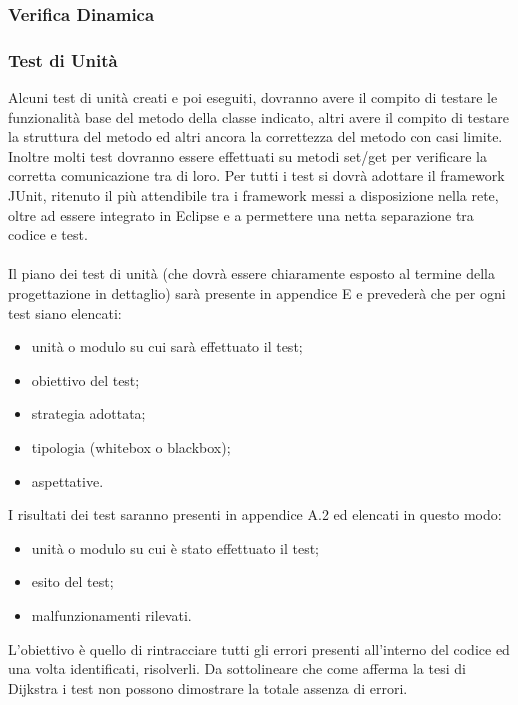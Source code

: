 \subsubsection{Verifica Dinamica}

\subsubsection*{Test di Unit\`a}

Alcuni test di unit\`a creati e poi eseguiti, dovranno  avere il
compito di testare le funzionalit\`a base del metodo della classe indicato,
altri avere il compito di testare la struttura del metodo ed altri ancora la
correttezza del metodo con casi limite. Inoltre molti test dovranno essere
effettuati su metodi set/get per verificare la corretta comunicazione tra di loro. Per tutti i test si dovr\`a adottare il framework
JUnit, ritenuto il pi\`u attendibile tra i framework messi a disposizione nella
rete, oltre ad essere integrato in Eclipse e a permettere una netta separazione
tra codice e test.
\\\\
Il piano dei test di unit\`a (che dovr\`a essere chiaramente esposto al termine
della progettazione in dettaglio) sar\`a presente in appendice E e preveder\`a
che per ogni test siano elencati:
\begin{itemize}
  \item unit\`a o modulo su cui sar\`a effettuato il test;
  \item obiettivo del test;
  \item strategia adottata;
  \item tipologia (whitebox o blackbox);
  \item aspettative.
\end{itemize}

I risultati dei test saranno presenti in appendice A.2 ed elencati in
questo modo:
\begin{itemize}
  \item unit\`a o modulo su cui \`e stato effettuato il test;
  \item esito del test;
  \item malfunzionamenti rilevati.
\end{itemize}

L'obiettivo \`e quello di rintracciare tutti gli errori presenti all'interno del
codice ed una volta identificati, risolverli. Da sottolineare che come afferma la tesi di Dijkstra 
i test non possono dimostrare la totale assenza di errori.


